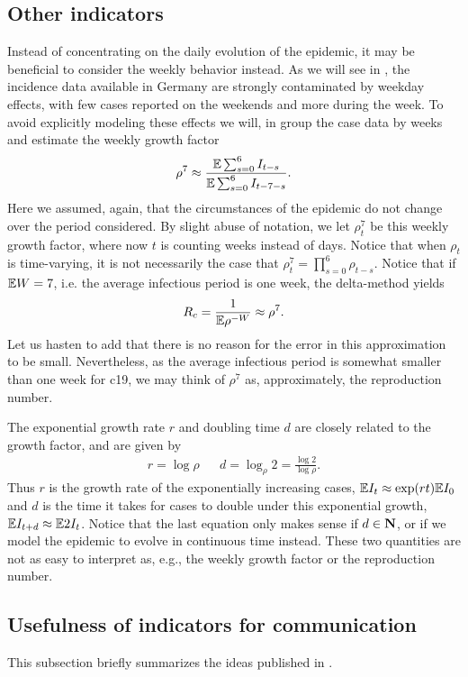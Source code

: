 \subsection{Other indicators}
\label{subsec:other_indicat}
Instead of concentrating on the daily evolution of the epidemic, it may be beneficial to consider the weekly behavior instead. As we will see in , the incidence data available in Germany are strongly contaminated by weekday effects, with few cases reported on the weekends and more during the week. To avoid explicitly modeling these effects we will, in  group the case data by weeks and estimate the weekly growth factor
$$
    \rho^{7} \approx \frac{ \mathbb E \sum_{s = 0}^{6} I_{t - s}}{\mathbb E \sum_{s = 0}^6 I_{t - 7 - s}}.
$$
Here we assumed, again, that the circumstances of the epidemic do not change over the period considered. By slight abuse of notation, we let $\rho^{7}_t$ be this weekly growth factor, where now $t$ is counting weeks instead of days. Notice that when $\rho_{t}$ is time-varying, it is not necessarily the case that $\rho^{7}_t = \prod_{s = 0}^{6} \rho_{t - s}$. Notice that if $\mathbb E W = 7$, i.e. the average infectious period is one week, the delta-method yields 
$$
    R_{c} = \frac{1}{\mathbb E \rho^{-W}} \approx \rho^{7}.
$$
Let us hasten to add that there is no reason for the error in this approximation to be small. Nevertheless, as the average infectious period is somewhat smaller than one week for \acrshort{c19}, we may think of $\rho^{7}$ as, approximately, the reproduction number.

The exponential growth rate $r$ and doubling time $d$ are closely related to the growth factor, and are given by 
\begin{align*}
    r = \log \rho && d = \log_{\rho} 2 = \frac{\log 2}{\log \rho}.
\end{align*}
Thus $r$ is the growth rate of the exponentially increasing cases, $\mathbb E I_{t} \approx \exp(rt) \mathbb E I_{0}$ and $d$ is the time it takes for cases to double under this exponential growth, $\mathbb E I_{t + d} \approx \mathbb E 2I_{t}$. Notice that the last equation only makes sense if $d \in \mathbf N$, or if we model the epidemic to evolve in continuous time instead. These two quantities are not as easy to interpret as, e.g., the weekly growth factor or the reproduction number. 

\subsection{Usefulness of indicators for communication}
\label{subsec:usefulness_of_indicators}
This subsection briefly summarizes the ideas published in \citep{Heyder2023Measures}.

